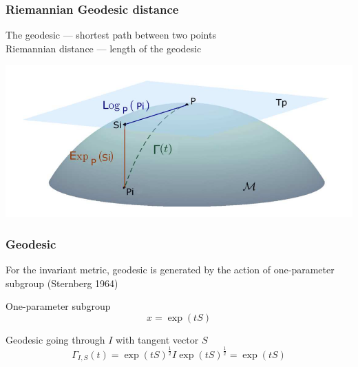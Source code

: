 \documentclass{beamer}
\begin{document}
\begin{frame}
\frametitle{Riemannian Geodesic distance}

\begin{block}{}
	The geodesic --- shortest path between two points\\
	Riemannian distance --- length of the geodesic
\end{block}
\includegraphics[scale=0.45]{manifold.png}

\end{frame}


\begin{frame}
\frametitle{Geodesic}
For the invariant metric, geodesic is generated by the action of one-parameter subgroup (Sternberg 1964)

\begin{block}{One-parameter subgroup}
	\begin{equation*}
	x = \exp(tS)
	\end{equation*}
\end{block}

\begin{block}{Geodesic going through $I$ with tangent vector $S$}
	\begin{equation*}
		\Gamma_{I,S}(t) = \exp(tS)^{\frac12}I\exp(tS)^{\frac12} = \exp({tS})
	\end{equation*}
\end{block}
\end{frame}
\end{document}
